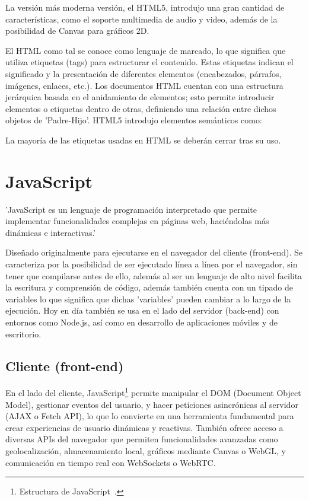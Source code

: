 \documentclass[a4paper, 12pt]{book}
\let\cleardoublepage\clearpage
\begin{document}
La versión más moderna versión, el HTML5, introdujo una gran cantidad de características, como el soporte multimedia de audio y video, además de la posibilidad de Canvas para gráficos 2D.

El HTML como tal se conoce como lenguaje de marcado, lo que significa que utiliza etiquetas (tags) para estructurar el contenido. Estas etiquetas indican el significado y la presentación de diferentes elementos (encabezados, párrafos, imágenes, enlaces, etc.). Los documentos HTML cuentan con una estructura jerárquica basada en el anidamiento de elementos; esto permite introducir elementos o etiquetas dentro de otras, definiendo una relación entre dichos objetos de 'Padre-Hijo'. HTML5 introdujo elementos semánticos como:

La mayoría de las etiquetas usadas en HTML se deberán cerrar tras su uso.
\cleardoublepage
\section{JavaScript} 
\label{sec:seccion7}

'JavaScript es un lenguaje de programación interpretado que permite implementar funcionalidades complejas en páginas web, haciéndolas más dinámicas e interactivas.' \cite{mdn_javascript_intro_es}

Diseñado originalmente para ejecutarse en el navegador del cliente (front-end). Se caracteriza por la posibilidad de ser ejecutado línea a línea por el navegador, sin tener que compilarse antes de ello, además al ser un lenguaje de alto nivel facilita la escritura y comprensión de código, además también cuenta con un tipado de variables lo que significa que dichas 'variables' pueden cambiar a lo largo de la ejecución. 
Hoy en día también se usa en el lado del servidor (back-end) con entornos como Node.js, así como en desarrollo de aplicaciones móviles y de escritorio.

\subsection{Cliente (front-end)}
En el lado del cliente, JavaScript\footnote{Estructura de JavaScript~\cite{mdn_javascript_data_structures}.} permite manipular el DOM (Document Object Model), gestionar eventos del usuario, y hacer peticiones asincrónicas al servidor (AJAX o Fetch API), lo que lo convierte en una herramienta fundamental para crear experiencias de usuario dinámicas y reactivas. También ofrece acceso a diversas APIs del navegador que permiten funcionalidades avanzadas como geolocalización, almacenamiento local, gráficos mediante Canvas o WebGL, y comunicación en tiempo real con WebSockets o WebRTC.
\end{document}
